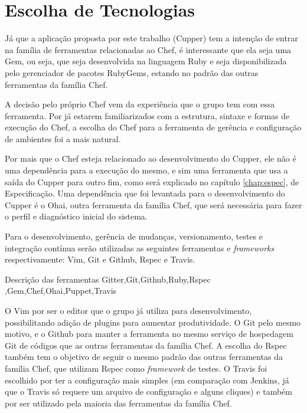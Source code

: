 \section{Escolha de Tecnologias}
\label{sec:tec}
Já que a aplicação proposta por este trabalho (Cupper) tem a intenção de entrar
na família de ferramentas relacionadas ao Chef, é interessante que ela seja uma
Gem, ou seja, que seja desenvolvida na linguagem Ruby e seja disponibilizada pelo
gerenciador de pacotes RubyGems, estando no padrão das outras ferramentas da
família Chef.

A decisão pelo próprio Chef vem da experiência que o grupo tem com essa ferramenta.
Por já estarem familiarizados com a estrutura, sintaxe e formas de execução do Chef,
a escolha do Chef para a ferramenta de gerência e configuração de ambientes foi a
mais natural.

Por mais que o Chef esteja relacionado ao desenvolvimento do Cupper, ele não é uma
dependência para a execução do mesmo, e sim uma ferramenta que usa a saída do Cupper
para outro fim, como será explicado no capítulo \ref{chap:espec}, de Especificação.
Uma dependência que foi levantada para o desenvolvimento do Cupper é o Ohai,
outra ferramenta da família Chef, que será necessária para fazer o perfil e diagnóstico
inicial do sistema.

Para o desenvolvimento, gerência de mudanças, versionamento, testes e integração
contínua serão utilizadas as seguintes ferramentas e \textit{frameworks} respectivamente:
Vim, Git e Github, Rspec e Travis.

{\color{red} Descrição das ferramentas Gitter,Git,Github,Ruby,Rspec
,Gem,Chef,Ohai,Puppet,Travis}

O Vim por ser o editor que o grupo já utiliza para
desenvolvimento, possibilitando adição de plugins para aumentar produtividade. O Git
pelo mesmo motivo, e o Github para manter a ferramenta no mesmo serviço de hospedagem
Git de códigos que as outras ferramentas da família Chef. A escolha do Rspec também
tem o objetivo de seguir o mesmo padrão das outras ferramentas da família Chef, que
utilizam Rspec como \textit{framework} de testes. O Travis foi escolhido por ter a
configuração mais simples (em comparação com Jenkins, já que o Travis só requere
um arquivo de configuração e alguns cliques) e também por ser utilizado pela
maioria das ferramentas da família Chef.
